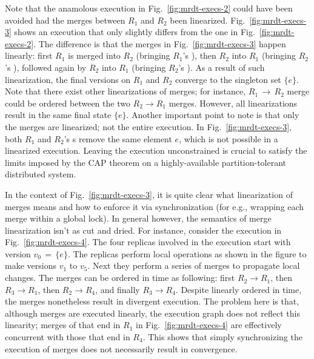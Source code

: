 Note that the anamolous execution in Fig.~\ref{fig:mrdt-execs-2} could
have been avoided had the merges between $R_1$ and $R_2$ been
linearized. Fig.~\ref{fig:mrdt-execs-3} shows an execution that only
slightly differs from the one in Fig.~\ref{fig:mrdt-execs-2}. The
difference is that the merges in Fig.~\ref{fig:mrdt-execs-3} happen
linearly: first $R_1$ is merged into $R_2$ (bringing $R_1$'s
), then $R_2$ into $R_1$ (bringing $R_2$'s ),
followed again by $R_2$ into $R_1$ (bringing $R_2$'s ). As a
result of such linearization, the final versions on $R_1$ and $R_2$
converge to the singleton set $\{e\}$. Note that there exist other
linearizations of merges; for instance, $R_1 \,\rightarrow\, R_2$
merge could be ordered between the two $R_2 \rightarrow R_1$ merges.
However, all linearizations result in the same final state $\{e\}$.
Another important point to note is that only the merges are
linearized; not the entire execution. In Fig.~\ref{fig:mrdt-execs-3},
both $R_1$ and $R_2$'s s remove the same element $e$, which
is not possible in a linearized execution. Leaving the execution
unconstrained is crucial to satisfy the limits imposed by the CAP
theorem on a highly-available partition-tolerant distributed system.

In the context of Fig.~\ref{fig:mrdt-execs-3}, it is quite clear what
linearization of merges means and how to enforce it via
synchronization (for e.g., wrapping each merge within a global lock).
In general however, the semantics of merge linearization isn't as cut
and dried. For instance, consider the execution in
Fig.~\ref{fig:mrdt-execs-4}. The four replicas involved in the
execution start with version $v_0 \,=\, \{e\}$. The replicas perform
local operations as shown in the figure to make versions $v_1$ to
$v_5$. Next they perform a series of merges to propagate local
changes. The merges can be ordered in time as following: first $R_2
\rightarrow R_1$, then $R_3 \rightarrow R_1$, then $R_2 \rightarrow
R_4$, and finally $R_3 \rightarrow R_4$. Despite linearly ordered in
time, the merges nonetheless result in divergent execution. The
problem here is that, although merges are executed linearly, the
execution graph does not reflect this linearity; merges of that end in
$R_1$ in Fig.~\ref{fig:mrdt-execs-4} are effectively concurrent with
those that end in $R_4$. This shows that simply synchronizing the
execution of merges does not necessarily result in convergence.


